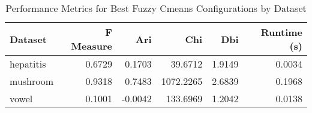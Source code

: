 \begin{table*}[ht!]
\caption{Performance Metrics for Best Fuzzy Cmeans Configurations by Dataset}
\label{tab:best_configs_fuzzy_cmeans_performance}
\begin{tabular}{lrrrrr}
Dataset & F Measure & Ari & Chi & Dbi & Runtime (s) \\\midrule

hepatitis & 0.6729 & 0.1703 & 39.6712 & 1.9149 & 0.0034 \\
mushroom & 0.9318 & 0.7483 & 1072.2265 & 2.6839 & 0.1968 \\
vowel & 0.1001 & -0.0042 & 133.6969 & 1.2042 & 0.0138 \\
\end{tabular}
\end{table*}
